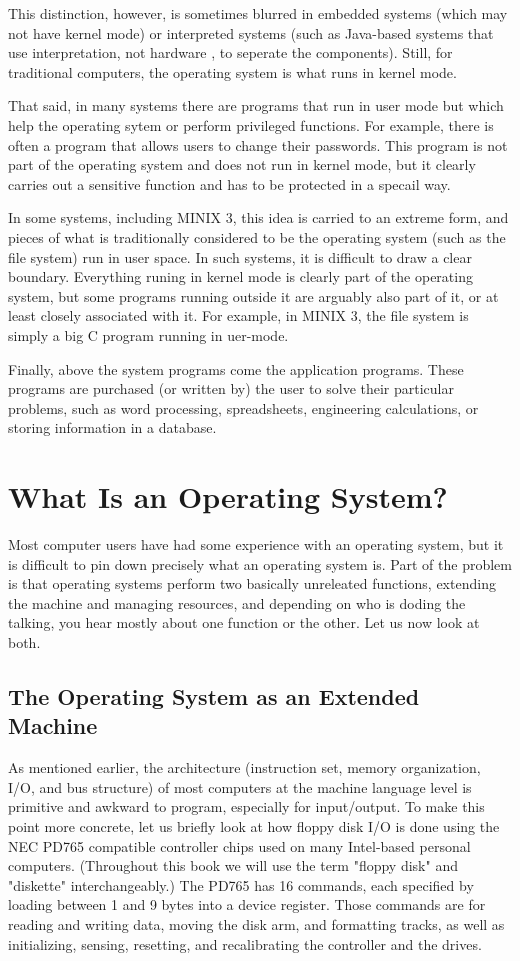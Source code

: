 \documentclass{book}
\begin{document}
This distinction, however, is sometimes blurred in embedded systems (which may not have kernel mode) 
or interpreted systems (such as Java-based systems that use interpretation, not hardware , to seperate the components).
Still, for traditional computers, the operating system is what runs in kernel mode.

That said, in many systems there are programs that run in user mode but which help the operating sytem or perform privileged functions.
For example, there is often a program that allows users to change their passwords.
This program is not part of the operating system and does not run in kernel mode, but it clearly carries out a sensitive function 
and has to be protected in a specail way.

In some systems, including MINIX 3, this idea is carried to an extreme form, 
and pieces of what is traditionally considered to be the operating system (such as the file system) run in user space.
In such systems, it is difficult to draw a clear boundary.
Everything runing in kernel mode is clearly part of the operating system, 
but some programs running outside it are arguably also part of it, or at least closely associated with it.
For example, in MINIX 3, the file system is simply a big C program running in uer-mode.

Finally, above the system programs come the application programs.
These programs are purchased (or written by) the user to solve their particular problems, 
such as word processing, spreadsheets, engineering calculations, or storing information in a database.

\section{What Is an Operating System?}
Most computer users have had some experience with an operating system, but it is difficult to pin down precisely what an operating system is.
Part of the problem is that operating systems perform two basically unreleated functions, extending the machine and managing resources, 
and depending on who is doding the talking, you hear mostly about one function or the other.
Let us now look at both.

\subsection{The Operating System as an Extended Machine}
As mentioned earlier, the architecture (instruction set, memory organization, I/O, and bus structure) of most computers 
at the machine language level is primitive and awkward to program, especially for input/output.
To make this point more concrete, let us briefly look at how floppy disk I/O is done 
using the NEC PD765 compatible controller chips used on many Intel-based personal computers.
(Throughout this book we will use the term "floppy disk" and "diskette" interchangeably.)
The PD765 has 16 commands, each specified by loading between 1 and 9 bytes into a device register.
Those commands are for reading and writing data, moving the disk arm, and formatting tracks, 
as well as initializing, sensing, resetting, and recalibrating the controller and the drives.
\end{document}
